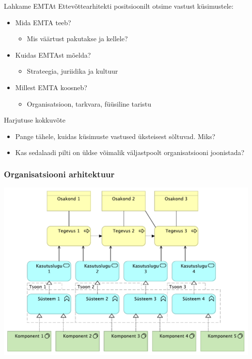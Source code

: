 \documentclass{beamer}
\begin{document}
\begin{frame}{Lahkame EMTAt}
Ettevõttearhitekti positsioonilt otsime vastust küsimustele:
\begin{itemize}
	\item Mida EMTA teeb?
		\begin{itemize}
			\item Mis väärtust pakutakse ja kellele?
		\end{itemize}
	\item Kuidas EMTAst mõelda?
	\begin{itemize}
		\item Strateegia, juriidika ja kultuur
	\end{itemize}
	\item Millest EMTA koosneb?
	\begin{itemize}
		\item Organisatsioon, tarkvara, füüsiline taristu
	\end{itemize}
\end{itemize}
\end{frame}


\begin{frame}{Harjutuse kokkuvõte}
	\begin{itemize}
		\item Pange tähele, kuidas küsimuste vastused üksteisest sõltuvad. Miks?
		\item Kas sedalaadi pilti on üldse võimalik väljastpoolt organisatsiooni joonistada?
	\end{itemize}
\end{frame}

\begin{frame}[fragile]
	\frametitle{Organisatsiooni arhitektuur}

	\begin{center}
	\includegraphics[width=.9\textwidth]{kihid.pdf}
	\end{center}
\end{frame}
\end{document}
